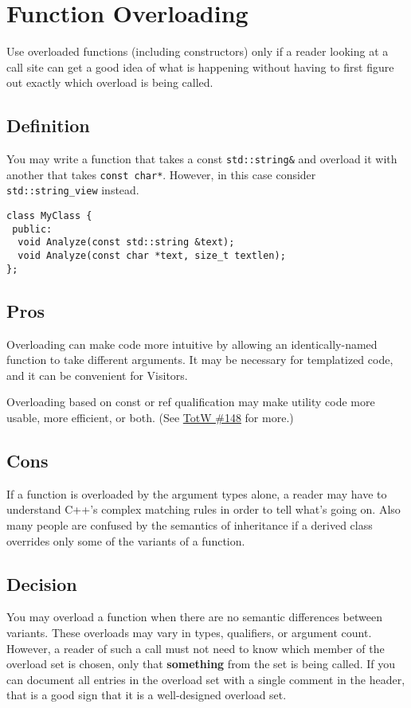 
\section{Function Overloading}\label{sec:function-overloading}
Use overloaded functions (including constructors) only if a reader looking at a call site can get a good idea of what is happening without having to first figure out exactly which overload is being called.

\subsection{Definition}
You may write a function that takes a const \texttt{std::string&} and overload it with another that takes \texttt{const char*}. However, in this case consider \texttt{std::string_view} instead.
\begin{verbatim}
class MyClass {
 public:
  void Analyze(const std::string &text);
  void Analyze(const char *text, size_t textlen);
};
\end{verbatim}

\subsection{Pros}
Overloading can make code more intuitive by allowing an identically-named function to take different arguments. It may be necessary for templatized code, and it can be convenient for Visitors.

Overloading based on const or ref qualification may make utility code more usable, more efficient, or both. (See \hyperref[ch:tip-of-the-week-148]{TotW \#148} for more.)

\subsection{Cons}
If a function is overloaded by the argument types alone, a reader may have to understand C++'s complex matching rules in order to tell what's going on. Also many people are confused by the semantics of inheritance if a derived class overrides only some of the variants of a function.

\subsection{Decision}
You may overload a function when there are no semantic differences between variants. These overloads may vary in types, qualifiers, or argument count. However, a reader of such a call must not need to know which member of the overload set is chosen, only that \textbf{something} from the set is being called. If you can document all entries in the overload set with a single comment in the header, that is a good sign that it is a well-designed overload set.

